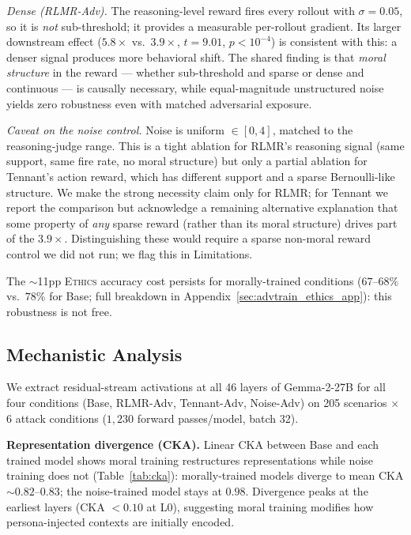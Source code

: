 \documentclass{article}
\newcommand{\rlmr}{\textnormal{RLMR}}
\newcommand{\ethics}{\textup{\textsc{Ethics}}}
\begin{document}
\emph{Dense (\rlmr{}-Adv).} The reasoning-level reward fires every rollout with $\sigma{=}0.05$, so it is \emph{not} sub-threshold; it provides a measurable per-rollout gradient. Its larger downstream effect ($5.8\times$ vs.\ $3.9\times$, $t{=}9.01$, $p{<}10^{-4}$) is consistent with this: a denser signal produces more behavioral shift. The shared finding is that \emph{moral structure} in the reward --- whether sub-threshold and sparse or dense and continuous --- is causally necessary, while equal-magnitude unstructured noise yields zero robustness even with matched adversarial exposure.

\emph{Caveat on the noise control.} Noise is uniform $\in[0,4]$, matched to the reasoning-judge range. This is a tight ablation for \rlmr{}'s reasoning signal (same support, same fire rate, no moral structure) but only a partial ablation for Tennant's action reward, which has different support and a sparse Bernoulli-like structure. We make the strong necessity claim only for \rlmr{}; for Tennant we report the comparison but acknowledge a remaining alternative explanation that some property of \emph{any} sparse reward (rather than its moral structure) drives part of the $3.9\times$. Distinguishing these would require a sparse non-moral reward control we did not run; we flag this in Limitations.

The $\sim$11pp \ethics{} accuracy cost persists for morally-trained conditions ($67$--$68\%$ vs.\ $78\%$ for Base; full breakdown in Appendix~\ref{sec:advtrain_ethics_app}): this robustness is not free.


\subsection{Mechanistic Analysis}
\label{sec:mechinterp}

We extract residual-stream activations at all 46 layers of Gemma-2-27B for all four conditions (Base, \rlmr{}-Adv, Tennant-Adv, Noise-Adv) on 205 scenarios $\times$ 6 attack conditions ($1{,}230$ forward passes/model, batch 32).

\textbf{Representation divergence (CKA).} Linear CKA between Base and each trained model shows moral training restructures representations while noise training does not (Table~\ref{tab:cka}): morally-trained models diverge to mean CKA $\sim 0.82$--$0.83$; the noise-trained model stays at $0.98$. Divergence peaks at the earliest layers (CKA $< 0.10$ at L0), suggesting moral training modifies how persona-injected contexts are initially encoded.
\end{document}
